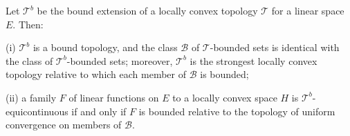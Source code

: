 Let $\mathcal{T}^b$ be the bound extension of a locally convex topology $\mathcal{T}$ for a linear space $E$. Then:

(i) $\mathcal{T}^b$ is a bound topology, and the class $\mathcal{B}$ of $\mathcal{T}$-bounded sets is identical with the class of $\mathcal{T}^b$-bounded sets; moreover, $\mathcal{T}^b$ is the strongest locally convex topology relative to which each member of $\mathcal{B}$ is bounded;

(ii) a family $F$ of linear functions on $E$ to a locally convex space $H$ is $\mathcal{T}^b$-equicontinuous if and only if $F$ is bounded relative to the topology of uniform convergence on members of $\mathcal{B}$.
